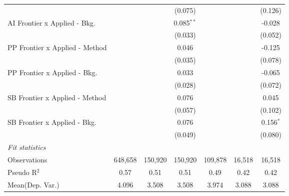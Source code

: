 \begin{tabular}{lcccccc}
                                  &               &               & (0.075)       &               &         & (0.126)\\   
   AI Frontier x Applied - Bkg.   &               &               & 0.085$^{**}$  &               &         & -0.028\\   
                                  &               &               & (0.033)       &               &         & (0.052)\\   
   PP Frontier x Applied - Method &               &               & 0.046         &               &         & -0.125\\   
                                  &               &               & (0.035)       &               &         & (0.078)\\   
   PP Frontier x Applied - Bkg.   &               &               & 0.033         &               &         & -0.065\\   
                                  &               &               & (0.028)       &               &         & (0.072)\\   
   SB Frontier x Applied - Method &               &               & 0.076         &               &         & 0.045\\   
                                  &               &               & (0.057)       &               &         & (0.102)\\   
   SB Frontier x Applied - Bkg.   &               &               & 0.076         &               &         & 0.156$^{*}$\\   
                                  &               &               & (0.049)       &               &         & (0.080)\\   
   \midrule
   \emph{Fit statistics}\\
   Observations                   & 648,658       & 150,920       & 150,920       & 109,878       & 16,518  & 16,518\\  
   Pseudo R$^2$                   & 0.57          & 0.51          & 0.51          & 0.49          & 0.42    & 0.42\\  
Mean(Dep. Var.) & 4.096 & 3.508 & 3.508 & 3.974 & 3.088 & 3.088 \\
   

\end{tabular}
